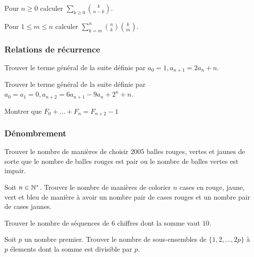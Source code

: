 \begin{exo}
Pour $n\ge 0$ calculer $\sum_{k\ge 0}\binom{k}{n-k}$.
\end{exo}


\begin{exo}
Pour $1\le m\le n$ calculer $\sum_{k=m}^{n} \binom{n}{k}\binom{k}{m}$.
\end{exo}


\subsubsection{Relations de récurrence}


\begin{exo}
Trouver le terme général de la suite définie par $a_0=1, a_{n+1} = 2a_n + n$.
\end{exo}


\begin{exo}
Trouver le terme général de la suite définie par $a_0 = a_1 = 0, a_{n + 2} = 6a_{n + 1} - 9a_n + 2^n + n$.
\end{exo}


\begin{exo}
Montrer que $F_0 + \dots + F_n = F_{n+2} - 1$
\end{exo}


\subsubsection{Dénombrement}


\begin{exo}
Trouver le nombre de manières de choisir $2005$ balles rouges, vertes et jaunes de sorte que le nombre de balles rouges est pair ou le nombre de balles vertes est impair.
\end{exo}


\begin{exo}
Soit $n\in\mathbb N^*$. Trouver le nombre de manières de colorier $n$ cases en rouge, jaune, vert et bleu de manière à avoir un nombre pair de cases rouges et un nombre pair de cases jaunes.
\end{exo}


\begin{exo}
Trouver le nombre de séquences de $6$ chiffres dont la somme vaut $10$.
\end{exo}


\begin{exo}
Soit $p$ un nombre premier. Trouver le nombre de sous-ensembles de $\{1,2,\dots,2p\}$ à $p$ élements dont la somme est divisible par $p$.
\end{exo}


